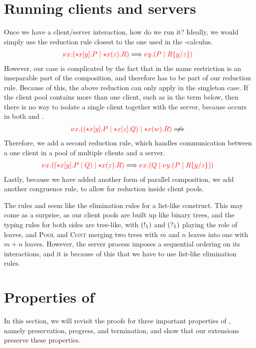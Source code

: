 \section{Running clients and servers}
Once we have a client/server interaction, how do we run it? Ideally, we would
simply use the reduction rule closest to the one used in the \textpi-calculus. 
\begin{gather*}
  \reducesto
  {\tm{\cpCut{x}{\ncCnt{x}{y}{P}}{\ncSrv{x}{z}{R}}}}
  {\tm{\cpCut{y}{P}{\cpSub{y}{z}{R}}}}
\end{gather*}
However, our case is complicated by the fact that in  the
name restriction is an inseparable part of the composition, and therefore has to
be part of our reduction rule. 
Because of this, the above reduction can only apply in the singleton case.
If the client pool contains more than one client, such as in the term below,
then there is no way to isolate a single client together with the server,
because  occurs in both  and .
\begin{gather*}
  \tm{\cpCut{x}{\ncPool{\ncCnt{x}{y}{P}}{\ncCnt{x}{z}{Q}}}{\ncSrv{x}{w}{R}}}
  \centernot\Longrightarrow
\end{gather*}
Therefore, we add a second reduction rule, which handles communication between a
one client in a pool of multiple clients and a server.
\begin{gather*}
  \reducesto
  {\tm{\cpCut{x}{\ncPool{\ncCnt{x}{y}{P}}{Q}}{\ncSrv{x}{z}{R}}}}
  {\tm{\cpCut{x}{Q}{\cpCut{y}{P}{\cpSub{y}{z}{R}}}}}
\end{gather*}
Lastly, because we have added another form of parallel composition, we add
another congruence rule, to allow for reduction inside client pools.


The rules  and  seem like the elimination
rules for a list-like construct. This may come as a surprise, as our client
pools are built up like binary trees, and the typing rules for both sides are
tree-like, with $(\take[1]{})$ and $(\give[1]{})$ playing the role of leaves,
and \textsc{Pool} and \textsc{Cont} merging two trees with $m$ and $n$ leaves
into one with $m+n$ leaves.
However, the server process imposes a sequential ordering on its interactions,
and it is because of this that we have to use list-like elimination rules.

\section{Properties of \nodcap}
In this section, we will revisit the proofs for three important properties of
\rcp, namely preservation, progress, and termination, and show that our
extensions preserve these properties.

